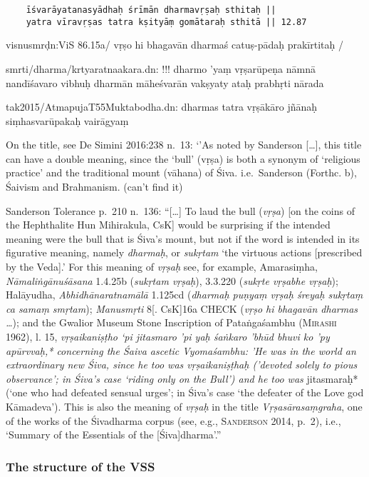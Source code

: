 \documentclass[]{article}
\begin{document}
\begin{verbatim}
    īśvarāyatanasyādhaḥ śrīmān dharmavṛṣaḥ sthitaḥ ||
    yatra vīravṛṣas tatra kṣityāṃ gomātaraḥ sthitā || 12.87
\end{verbatim}

visnusmrḍn:ViS 86.15a/ vṛṣo hi bhagavān dharmaś catuṣ-pādaḥ prakīrtitaḥ
/

smrti/dharma/krtyaratnaakara.dn: !!! dharmo 'yaṃ vṛṣarūpeṇa nāmnā
nandīśavaro vibhuḥ \textbar{} dharmān māheśvarān vakṣyaty ataḥ prabhṛti
nārada\textbar{}\textbar{}

tak2015/AtmapujaT55Muktabodha.dn: dharmas tatra vṛṣākāro jñānaḥ
siṃhasvarūpakaḥ \textbar{} vairāgyaṃ

On the title, see De Simini 2016:238 n.~13: `'As noted by Sanderson
{[}\ldots{}{]}, this title can have a double meaning, since the `bull'
(vṛṣa) is both a synonym of `religious practice' and the traditional
mount (vāhana) of Śiva. i.e.~Sanderson (Forthc. b), Śaivism and
Brahmanism. (can't find it)

Sanderson Tolerance p.~210 n.~136: ``{[}\ldots{}{]} To laud the bull
(\emph{vṛṣa}) {[}on the coins of the Hephthalite Hun Mihirakula, CsK{]}
would be surprising if the intended meaning were the bull that is Śiva's
mount, but not if the word is intended in its figurative meaning, namely
\emph{dharmaḥ}, or \emph{sukṛtam} `the virtuous actions {[}prescribed by
the Veda{]}.' For this meaning of \emph{vṛṣaḥ} see, for example,
Amarasiṃha, \emph{Nāmaliṅgānuśāsana} 1.4.25b (\emph{sukṛtam vṛṣaḥ}),
3.3.220 (\emph{sukṛte vṛṣabhe vṛṣaḥ}); Halāyudha,
\emph{Abhidhānaratnamālā} 1.125cd (\emph{dharmaḥ puṇyaṃ vṛṣaḥ śreyaḥ
sukṛtaṃ ca samaṃ smṛtam}); \emph{Manusmṛti} 8{[}. CsK{]}16a CHECK
(\emph{vṛṣo hi bhagavān dharmas \ldots{}}); and the Gwalior Museum Stone
Inscription of Pataṅgaśambhu (\textsc{Mirashi} 1962), l. 15,
\emph{vṛṣaikaniṣṭho `pi jitasmaro 'pi yaḥ śaṅkaro 'bhūd bhuvi ko 'py
apūrvvaḥ,* concerning the Śaiva ascetic Vyomaśambhu: 'He was in the
world an extraordinary new Śiva, since he too was \emph{vṛṣaikaniṣṭhaḥ}
('devoted solely to pious observance'; in Śiva's case `riding only on
the Bull') and he too was }jitasmaraḥ* (`one who had defeated sensual
urges'; in Śiva's case `the defeater of the Love god Kāmadeva'). This is
also the meaning of \emph{vṛṣaḥ} in the title \emph{Vṛṣasārasaṃgraha},
one of the works of the Śivadharma corpus (see, e.g., \textsc{Sanderson}
2014, p.~2), i.e., `Summary of the Essentials of the
{[}Śiva{]}dharma'.''

\hypertarget{the-structure-of-the-vss}{%
\subsubsection{The structure of the
VSS}\label{the-structure-of-the-vss}}
\end{document}
